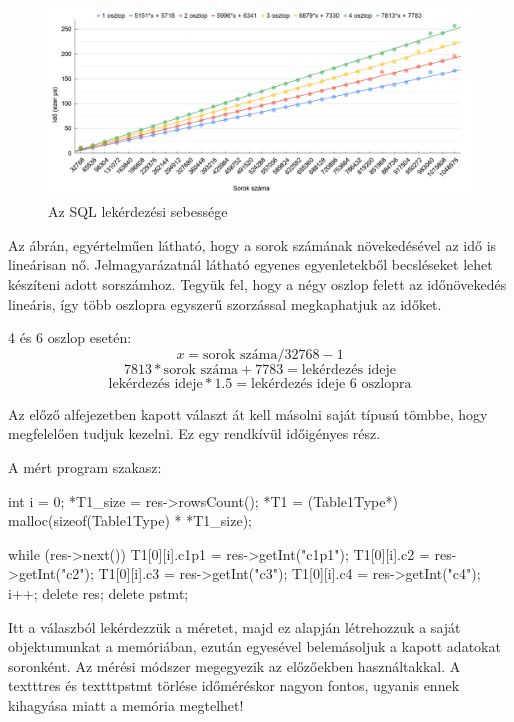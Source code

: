 \begin{figure}[h!]
\centering
\includegraphics[width=\textwidth]{images/sqlquery.png}
\caption{Az SQL lekérdezési sebessége}
\label{fig:schema}
\end{figure}
Az ábrán, egyértelműen látható, hogy a sorok számának növekedésével az idő is lineárisan nő.
Jelmagyarázatnál látható egyenes egyenletekből becsléseket lehet készíteni adott sorszámhoz. Tegyük fel, hogy a négy oszlop felett az időnövekedés lineáris, így több oszlopra egyszerű szorzással megkaphatjuk az időket.

4 és 6 oszlop esetén:
$$ x = \text{sorok száma}/32768 - 1 $$
$$ 7813 * \text{sorok száma} + 7783 = \text{lekérdezés ideje}$$
$$ \text{lekérdezés ideje} * 1.5 = \text{lekérdezés ideje 6 oszlopra} $$


Az előző alfejezetben kapott választ át kell másolni saját típusú tömbbe, hogy megfelelően tudjuk kezelni. Ez egy rendkívül időigényes rész. 

A mért program szakasz:
\begin{python}
int i = 0;
*T1_size = res->rowsCount();
*T1 = (Table1Type*) malloc(sizeof(Table1Type) * *T1_size);

while (res->next())
	{
		T1[0][i].c1p1 = res->getInt("c1p1");
		T1[0][i].c2 = res->getInt("c2");
		T1[0][i].c3 = res->getInt("c3");
		T1[0][i].c4 = res->getInt("c4");
		i++;
	}
delete res;
delete pstmt;
\end{python}

Itt a válaszból lekérdezzük a méretet, majd ez alapján létrehozzuk a saját objektumunkat a memóriában, ezután egyesével belemásoljuk 
a kapott adatokat soronként.
Az mérési módszer megegyezik az előzőekben használtakkal.
A texttt{res} és texttt{pstmt} törlése időméréskor nagyon fontos, ugyanis ennek kihagyása miatt a memória megtelhet!


